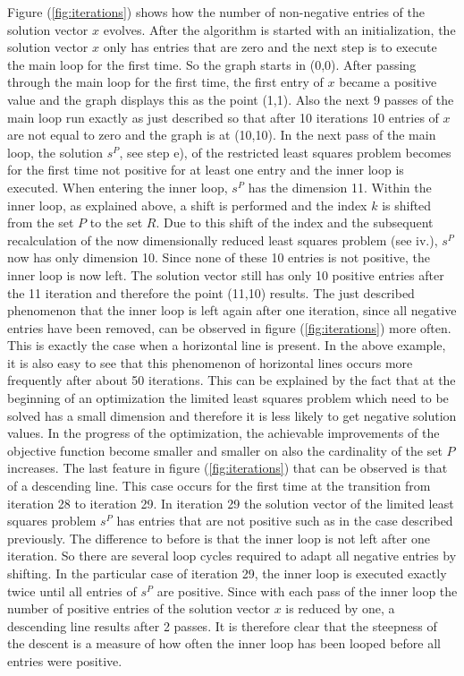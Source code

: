 Figure (\ref{fig:iterations}) shows how the number of non-negative entries of the solution vector $x$ evolves. After the algorithm is started with an initialization, the solution vector $x$ only has entries that are zero and the next step is to execute the main loop for the first time. So the graph starts in (0,0). After passing through the main loop for the first time, the first entry of $x$ became a positive value and the graph displays this as the point (1,1). Also the next 9 passes of the main loop run exactly as just described so that after 10 iterations 10 entries of $x$ are not equal to zero and the graph is at (10,10). In the next pass of the main loop, the solution $s^P$, see step e), of the restricted least squares problem becomes for the first time not positive for at least one entry and the inner loop is executed. When entering the inner loop, $s^P$ has the dimension 11. Within the inner loop, as explained above, a shift is performed and the index $k$ is shifted from the set $P$ to the set $R$. Due to this shift of the index and the subsequent recalculation of the now dimensionally reduced least squares problem (see iv.), $s^P$ now has only dimension 10. Since none of these 10 entries is not positive, the inner loop is now left. The solution vector still has only 10 positive entries after the 11 iteration and therefore the point (11,10) results. The just described phenomenon that the inner loop is left again after one iteration, since all negative entries have been removed, can be observed in figure (\ref{fig:iterations}) more often. This is exactly the case when a horizontal line is present. In the above example, it is also easy to see that this phenomenon of horizontal lines occurs more frequently after about 50 iterations. This can be explained by the fact that at the beginning of an optimization the limited least squares problem which need to be solved has a small dimension and therefore it is less likely to get negative solution values. In the progress of the optimization, the achievable improvements of the objective function become smaller and smaller on also the cardinality of the set $P$ increases. The last feature in figure (\ref{fig:iterations}) that can be observed is that of a descending line. This case occurs for the first time at the transition from iteration 28 to iteration 29. In iteration 29 the solution vector of the limited least squares problem $s^P$ has entries that are not positive such as in the case described previously. The difference to before is that the inner loop is not left after one iteration. So there are several loop cycles required to adapt all negative entries by shifting. In the particular case of iteration 29, the inner loop is executed exactly twice until all entries of $s^P$ are positive. Since with each pass of the inner loop the number of positive entries of the solution vector $x$ is reduced by one, a descending line results after 2 passes. It is therefore clear that the steepness of the descent is a measure of how often the inner loop has been looped before all entries were positive. 


